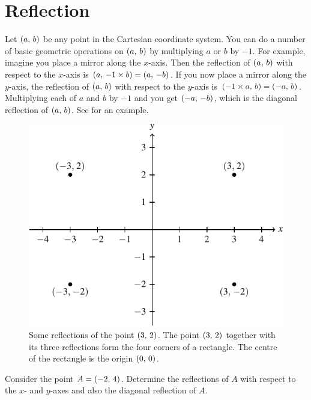 \documentclass[a4paper,oneside,12pt]{article}
\begin{document}
\section{Reflection}

Let $\left\lparen{a},\, {b}\right\rparen$ be any point in the Cartesian coordinate system.
You can do a number of basic geometric operations on $\left\lparen{a},\, {b}\right\rparen$ by
multiplying $a$ or $b$ by $-1$.  For example, imagine you place a
mirror along the $x$-axis.  Then the reflection of $\left\lparen{a},\, {b}\right\rparen$ with
respect to the $x$-axis is $\left\lparen{a},\, {-1 \times b}\right\rparen = \left\lparen{a},\, {-b}\right\rparen$.
If you now place a mirror along the $y$-axis, the reflection of
$\left\lparen{a},\, {b}\right\rparen$ with respect to the $y$-axis is
$\left\lparen{-1 \times a},\, {b}\right\rparen = \left\lparen{-a},\, {b}\right\rparen$.  Multiplying each of $a$ and
$b$ by $-1$ and you get $\left\lparen{-a},\, {-b}\right\rparen$, which is the diagonal
reflection of $\left\lparen{a},\, {b}\right\rparen$.  See 
for an example.

\begin{figure}[!htbp]
\centering
\includegraphics[scale=1.1]{image/03/reflection.pdf}
\caption{%
  Some reflections of the point $\left\lparen{3},\, {2}\right\rparen$.  The point
  $\left\lparen{3},\, {2}\right\rparen$ together with its three reflections form the four
  corners of a rectangle.  The centre of the rectangle is the origin
  $\left\lparen{0},\, {0}\right\rparen$.
}
\label{fig:reflections_of_point}
\end{figure}

\begin{exercise}
Consider the point $A = \left\lparen{-2},\, {4}\right\rparen$.  Determine the reflections of
$A$ with respect to the $x$- and $y$-axes and also the diagonal
reflection of $A$.
\end{exercise}
\end{document}
